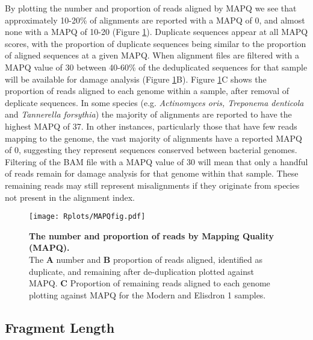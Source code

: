 \documentclass[12pt, a4paper]{article}
\begin{document}
By plotting the number and proportion of reads aligned by MAPQ we see that approximately 10-20\% of alignments are reported with a MAPQ of 0, and almost none with a MAPQ of 10-20 (Figure \ref{fig:MAPQfig}). 
Duplicate sequences appear at all MAPQ scores, with the proportion of duplicate sequences being similar to the proportion of aligned sequences at a given MAPQ. 
When alignment files are filtered with a MAPQ value of 30 between 40-60\% of the deduplicated sequences for that sample will be available for damage analysis (Figure \ref{fig:MAPQfig}B). 
Figure \ref{fig:MAPQfig}C shows the proportion of reads aligned to each genome within a sample, after removal of deplicate sequences. 
In some species (e.g. \textit{Actinomyces oris, Treponema denticola} and \textit{Tannerella forsythia}) the majority of alignments are reported to have the highest MAPQ of 37. 
In other instances, particularly those that have few reads mapping to the genome, the vast majority of alignments have a reported MAPQ of 0, suggesting they represent sequences conserved between bacterial genomes. 
Filtering of the BAM file with a MAPQ value of 30 will mean that only a handful of reads remain for damage analysis for that genome within that sample.
These remaining reads may still represent misalignments if they originate from species not present in the alignment index.  

\begin{figure}[h]
\setlength\abovecaptionskip{20pt}
	\texttt{[image: Rplots/MAPQfig.pdf]}
	\caption[The number and proportion of reads by Mapping Quality (MAPQ)]{\textbf{The number and proportion of reads by Mapping Quality (MAPQ).}\\ \small The \textbf{A} number and \textbf{B} proportion of reads aligned, identified as duplicate, and remaining after de-duplication plotted against MAPQ. \textbf{C} Proportion of remaining reads aligned to each genome plotting against MAPQ for the Modern and Elisdron 1 samples.}\label{fig:MAPQfig}
\end{figure}
\clearpage

\subsection{Fragment Length}\label{sssec:fragLength}
\end{document}
